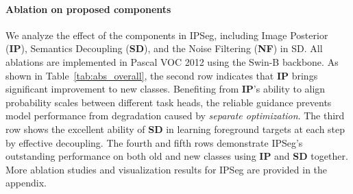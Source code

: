 \paragraph{Ablation on proposed components} 
We analyze the effect of the components in IPSeg, including Image Posterior (\textbf{IP}), Semantics Decoupling (\textbf{SD}), and the Noise Filtering (\textbf{NF}) in SD. All ablations are implemented in Pascal VOC 2012 using the Swin-B backbone. As shown in Table~\ref{tab:abs_overall}, the second row indicates that \textbf{IP} brings significant improvement to new classes. Benefiting from \textbf{IP}'s ability to align probability scales between different task heads, the reliable guidance prevents model performance from degradation caused by \textit{separate optimization}. The third row shows the excellent ability of \textbf{SD} in learning foreground targets at each step by effective decoupling. 
The fourth and fifth rows demonstrate IPSeg's outstanding performance on both old and new classes using \textbf{IP} and \textbf{SD} together. More ablation studies and visualization results for IPSeg are provided in the appendix. 



